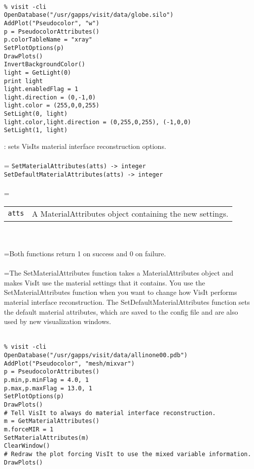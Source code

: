 \documentclass[10pt,a4paper]{report}
\begin{document}
\\[-6mm]
\begin{verbatim}% visit -cli
OpenDatabase("/usr/gapps/visit/data/globe.silo")
AddPlot("Pseudocolor", "w")
p = PseudocolorAttributes()
p.colorTableName = "xray"
SetPlotOptions(p)
DrawPlots()
InvertBackgroundColor()
light = GetLight(0)
print light
light.enabledFlag = 1
light.direction = (0,-1,0)
light.color = (255,0,0,255)
SetLight(0, light)
light.color,light.direction = (0,255,0,255), (-1,0,0)
SetLight(1, light)
\end{verbatim}
\newpage


{}
: sets VisIts material interface reconstruction options.\\[-3mm]

 \\ 
\hangindent=\parindent 
\verb!SetMaterialAttributes(atts) -> integer!\\ 
\verb!SetDefaultMaterialAttributes(atts) -> integer!\\ [-3mm]

 \\ 
\hangindent=\parindent 
\begin{tabular}{lp{9cm}}
\verb!atts! & A MaterialAttributes object containing the new settings. \\
\end{tabular} \\[-2mm]


 \\ 
\hangindent=\parindent Both functions return 1 on success and 0 on failure. \\[-3mm] 

 \\ 
\hangindent=\parindent The SetMaterialAttributes function takes a MaterialAttributes object and makes VisIt use the material settings that it contains. You use the SetMaterialAttributes function when you want to change how VisIt performs material interface reconstruction. The SetDefaultMaterialAttributes function sets the default material attributes, which are saved to the config file and are also used by new visualization windows. \\[-3mm] 

\\[-6mm]
\begin{verbatim}% visit -cli
OpenDatabase("/usr/gapps/visit/data/allinone00.pdb")
AddPlot("Pseudocolor", "mesh/mixvar")
p = PseudocolorAttributes()
p.min,p.minFlag = 4.0, 1
p.max,p.maxFlag = 13.0, 1
SetPlotOptions(p)
DrawPlots()
# Tell VisIt to always do material interface reconstruction.
m = GetMaterialAttributes()
m.forceMIR = 1
SetMaterialAttributes(m)
ClearWindow()
# Redraw the plot forcing VisIt to use the mixed variable information.
DrawPlots()
\end{verbatim}
\newpage
\end{document}
